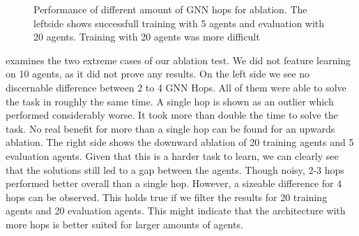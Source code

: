 \begin{figure}[htp]
    \centering
    \hspace{1cm}                       
    \caption{Performance of different amount of GNN hops for ablation. The leftside shows successfull training with 5 agents and evaluation with 20 agents. Training with 20 agents was more difficult}
    \label{fig:ablation-5-20-20-5}
\end{figure}

 examines the two extreme cases of our ablation test. We did not feature learning on 10 agents, as it did not prove any results. On the left side we see no discernable difference between 2 to 4 GNN Hops. All of them were able to solve the task in roughly the same time. A single hop is shown as an outlier which performed considerably worse. It took more than double the time to solve the task. No real benefit for more than a single hop can be found for an upwards ablation. The right side shows the downward ablation of 20 training agents and 5 evaluation agents. Given that this is a harder task to learn, we can clearly see that the solutions still led to a gap between the agents. Though noisy, 2-3 hops performed better overall than a single hop. However, a sizeable difference for 4 hops can be observed. This holds true if we filter the results for 20 training agents and 20 evaluation agents. This might indicate that the architecture with more hops is better suited for larger amounts of agents. 

